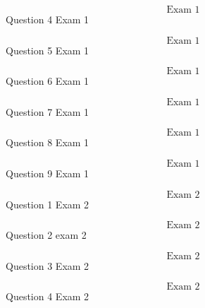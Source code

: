 \documentclass{article}
\begin{document}
    $$\text{Exam 1}$$
    Question 4 Exam 1
    \pagebreak


    $$\text{Exam 1}$$
    Question 5 Exam 1
    \pagebreak

    $$\text{Exam 1}$$
    Question 6 Exam 1
    \pagebreak

    $$\text{Exam 1}$$
    Question 7 Exam 1
    \pagebreak

    $$\text{Exam 1}$$
    Question 8 Exam 1
    \pagebreak

    $$\text{Exam 1}$$
    Question 9 Exam 1
    \pagebreak


    $$\text{Exam 2}$$
    Question 1 Exam 2
    \pagebreak

    $$\text{Exam 2}$$
    Question 2 exam 2
    \pagebreak

    $$\text{Exam 2}$$
    Question 3 Exam 2
    \pagebreak


    $$\text{Exam 2}$$
    Question 4 Exam 2
    \pagebreak
\end{document}
